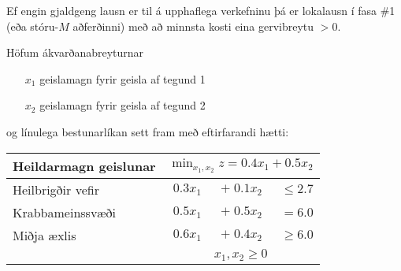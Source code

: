 \begin{aths}
Ef engin gjaldgeng lausn er til á upphaflega verkefninu þá er lokalausn í fasa \#1 (eða stóru-$M$ aðferðinni) með að minnsta kosti eina gervi\-breytu $>0$.
\end{aths}

\newpage 
\begin{daemi}\label{daemi:krabbi}

Höfum ákvarðanabreyturnar
\begin{itemize}
 \item[$x_1$] geislamagn fyrir geisla af tegund 1 
 \item[$x_2$] geislamagn fyrir geisla af tegund 2
\end{itemize}
og línulega bestunarlíkan sett fram með eftirfarandi hætti:

\begin{center}{\renewcommand{\arraystretch}{1.5} \renewcommand{\tabcolsep}{0.2cm}
\begin{tabular}{|l|rrr|}\hline
Heildarmagn geislunar & \multicolumn{3}{c|}{$\min_{x_1,x_2} z = 0.4x_1 + 0.5x_2$} \\ \hline
Heilbrigðir vefir & $0.3x_1$ & $+\; 0.1x_2$ & $ \le  2.7 $ \\
Krabbameinssvæði & $ 0.5x_1 $&$ +\; 0.5x_2 $&$=  6.0 $ \\
Miðja æxlis & $0.6x_1$&$ +\; 0.4x_2$& $\ge 6.0$ \\ 
& \multicolumn{3}{c|}{$x_1,x_2 \ge 0$} \\ \hline
\end{tabular}} 
\end{center}
\end{daemi}
